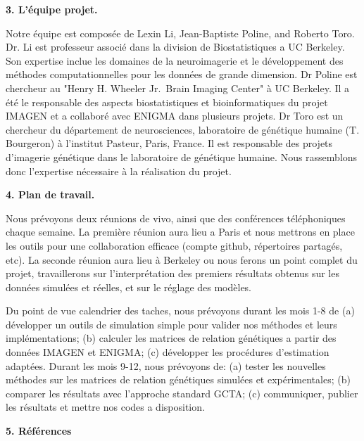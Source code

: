 \documentclass[12pt]{article}
\begin{document}
\noindent
{\large \textbf{3. L'\'equipe projet.}}
\medskip

\noindent
Notre \'equipe est compos\'ee de Lexin Li, Jean-Baptiste Poline, and Roberto Toro. Dr. Li est professeur associ\'e dans la division de Biostatistiques a UC Berkeley. Son expertise inclue les domaines de la neuroimagerie et le d\'eveloppement des m\'ethodes computationnelles pour les donn\'ees de grande dimension. Dr Poline est chercheur au "Henry H. Wheeler Jr.\ Brain Imaging Center" \`a UC Berkeley. Il a \'et\'e le responsable des aspects biostatistiques et bioinformatiques du projet IMAGEN et a collabor\'e avec ENIGMA dans plusieurs projets. Dr Toro est un chercheur du d\'epartement de neurosciences, laboratoire de g\'en\'etique humaine (T. Bourgeron) \`a l'institut Pasteur, Paris, France. Il est responsable des projets d'imagerie g\'en\'etique dans le laboratoire de g\'en\'etique humaine. Nous rassemblons donc l'expertise n\'ecessaire \`a la r\'ealisation du projet.  
\bigskip



\noindent
{\large \textbf{4. Plan de travail.}}
\medskip

\noindent
Nous pr\'evoyons deux r\'eunions de vivo, ainsi que des conf\'erences t\'el\'ephoniques chaque semaine. La premi\`ere r\'eunion aura lieu a Paris et nous mettrons en place les outils pour une collaboration efficace (compte github, r\'epertoires partag\'es, etc). La seconde r\'eunion aura lieu \`a Berkeley ou nous ferons un point complet du projet, travaillerons sur l'interpr\'etation des premiers r\'esultats obtenus sur les donn\'ees simul\'ees et r\'eelles, et sur le r\'eglage des mod\`eles.

Du point de vue calendrier des taches, nous pr\'evoyons durant les mois 1-8 de (a) d\'evelopper un outils de simulation simple pour valider nos m\'ethodes et leurs impl\'ementations; (b) calculer les matrices de relation g\'en\'etiques a partir des donn\'ees IMAGEN et ENIGMA; (c) d\'evelopper les proc\'edures d'estimation adapt\'ees. Durant les mois 9-12, nous pr\'evoyons de: (a) tester les nouvelles m\'ethodes sur les matrices de relation g\'en\'etiques simul\'ees et exp\'erimentales; (b) comparer les r\'esultats avec l'approche standard GCTA; (c) communiquer, publier les r\'esultats et mettre nos codes a disposition. 
\bigskip



\noindent
{\large \textbf{5. R\'ef\'erences}}
\medskip
\end{document}
